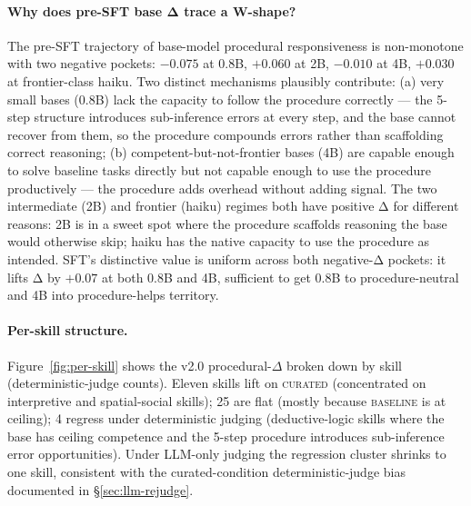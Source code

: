 \documentclass[10pt]{article}
\newcommand{\BL}{\textsc{baseline}\xspace}
\newcommand{\CU}{\textsc{curated}\xspace}
\begin{document}
\paragraph{Why does pre-SFT base Δ trace a W-shape?} The pre-SFT trajectory of base-model procedural responsiveness is non-monotone with two negative pockets: $-0.075$ at 0.8B, $+0.060$ at 2B, $-0.010$ at 4B, $+0.030$ at frontier-class haiku. Two distinct mechanisms plausibly contribute: (a) very small bases (0.8B) lack the capacity to follow the procedure correctly --- the 5-step structure introduces sub-inference errors at every step, and the base cannot recover from them, so the procedure compounds errors rather than scaffolding correct reasoning; (b) competent-but-not-frontier bases (4B) are capable enough to solve baseline tasks directly but not capable enough to use the procedure productively --- the procedure adds overhead without adding signal. The two intermediate (2B) and frontier (haiku) regimes both have positive Δ for different reasons: 2B is in a sweet spot where the procedure scaffolds reasoning the base would otherwise skip; haiku has the native capacity to use the procedure as intended. SFT's distinctive value is uniform across both negative-Δ pockets: it lifts Δ by $+0.07$ at both 0.8B and 4B, sufficient to get 0.8B to procedure-neutral and 4B into procedure-helps territory.

\paragraph{Per-skill structure.} Figure~\ref{fig:per-skill} shows the v2.0 procedural-$\Delta$ broken down by skill (deterministic-judge counts). Eleven skills lift on \CU{} (concentrated on interpretive and spatial-social skills); 25 are flat (mostly because \BL{} is at ceiling); 4 regress under deterministic judging (deductive-logic skills where the base has ceiling competence and the 5-step procedure introduces sub-inference error opportunities). Under LLM-only judging the regression cluster shrinks to one skill, consistent with the curated-condition deterministic-judge bias documented in \S\ref{sec:llm-rejudge}.
\end{document}
